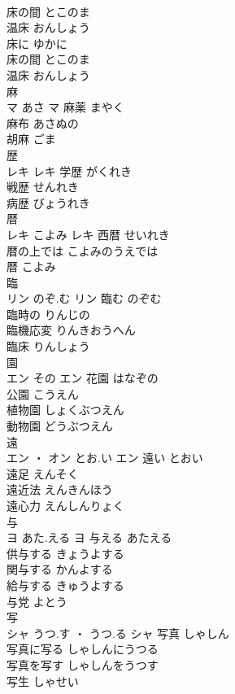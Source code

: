 \documentclass[8pt]{extreport}
\begin{document}
\begin{CJK}{UTF8}{min}
\\	床の間	とこのま	
\\	温床	おんしょう	
\\	床に	ゆかに	
\\	床の間	とこのま	
\\	温床	おんしょう	
\\	麻	
\\	マ	あさ	マ	麻薬	まやく	
\\	麻布	あさぬの	
\\	胡麻	ごま	
\\	歴	
\\	レキ		レキ	学歴	がくれき	
\\	戦歴	せんれき	
\\	病歴	びょうれき	
\\	暦	
\\	レキ	こよみ	レキ	西暦	せいれき	
\\	暦の上では	こよみのうえでは	
\\	暦	こよみ	
\\	臨	
\\	リン	のぞ.む	リン	臨む	のぞむ	
\\	臨時の	りんじの	
\\	臨機応変	りんきおうへん	
\\	臨床	りんしょう	
\\	園	
\\	エン	その	エン	花園	はなぞの	
\\	公園	こうえん	
\\	植物園	しょくぶつえん	
\\	動物園	どうぶつえん	
\\	遠	
\\	エン ・ オン	とお.い	エン	遠い	とおい	
\\	遠足	えんそく	
\\	遠近法	えんきんほう	
\\	遠心力	えんしんりょく	
\\	与	
\\	ヨ	あた.える	ヨ	与える	あたえる	
\\	供与する	きょうよする	
\\	関与する	かんよする	
\\	給与する	きゅうよする	
\\	与党	よとう	
\\	写	
\\	シャ	うつ.す ・ うつ.る	シャ	写真	しゃしん	
\\	写真に写る	しゃしんにうつる	
\\	写真を写す	しゃしんをうつす	
\\	写生	しゃせい	

\end{CJK}
\end{document}
